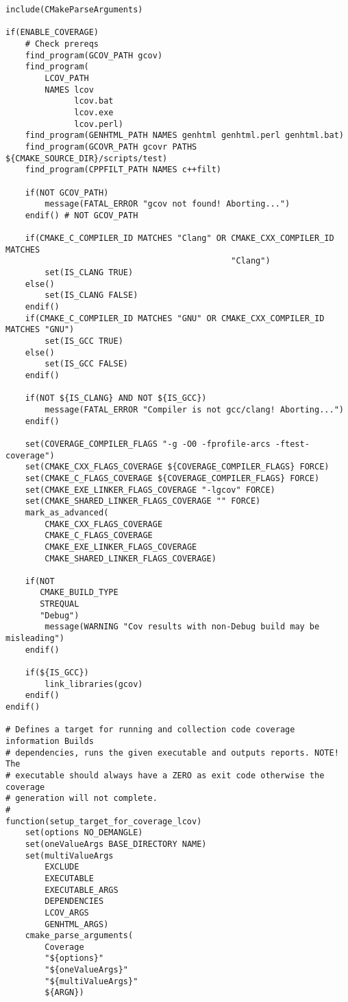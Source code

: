 \documentclass[openany]{report}
\begin{document}
\begin{verbatim}
include(CMakeParseArguments)

if(ENABLE_COVERAGE)
    # Check prereqs
    find_program(GCOV_PATH gcov)
    find_program(
        LCOV_PATH
        NAMES lcov
              lcov.bat
              lcov.exe
              lcov.perl)
    find_program(GENHTML_PATH NAMES genhtml genhtml.perl genhtml.bat)
    find_program(GCOVR_PATH gcovr PATHS ${CMAKE_SOURCE_DIR}/scripts/test)
    find_program(CPPFILT_PATH NAMES c++filt)

    if(NOT GCOV_PATH)
        message(FATAL_ERROR "gcov not found! Aborting...")
    endif() # NOT GCOV_PATH

    if(CMAKE_C_COMPILER_ID MATCHES "Clang" OR CMAKE_CXX_COMPILER_ID MATCHES
                                              "Clang")
        set(IS_CLANG TRUE)
    else()
        set(IS_CLANG FALSE)
    endif()
    if(CMAKE_C_COMPILER_ID MATCHES "GNU" OR CMAKE_CXX_COMPILER_ID MATCHES "GNU")
        set(IS_GCC TRUE)
    else()
        set(IS_GCC FALSE)
    endif()

    if(NOT ${IS_CLANG} AND NOT ${IS_GCC})
        message(FATAL_ERROR "Compiler is not gcc/clang! Aborting...")
    endif()

    set(COVERAGE_COMPILER_FLAGS "-g -O0 -fprofile-arcs -ftest-coverage")
    set(CMAKE_CXX_FLAGS_COVERAGE ${COVERAGE_COMPILER_FLAGS} FORCE)
    set(CMAKE_C_FLAGS_COVERAGE ${COVERAGE_COMPILER_FLAGS} FORCE)
    set(CMAKE_EXE_LINKER_FLAGS_COVERAGE "-lgcov" FORCE)
    set(CMAKE_SHARED_LINKER_FLAGS_COVERAGE "" FORCE)
    mark_as_advanced(
        CMAKE_CXX_FLAGS_COVERAGE
        CMAKE_C_FLAGS_COVERAGE
        CMAKE_EXE_LINKER_FLAGS_COVERAGE
        CMAKE_SHARED_LINKER_FLAGS_COVERAGE)

    if(NOT
       CMAKE_BUILD_TYPE
       STREQUAL
       "Debug")
        message(WARNING "Cov results with non-Debug build may be misleading")
    endif()

    if(${IS_GCC})
        link_libraries(gcov)
    endif()
endif()

# Defines a target for running and collection code coverage information Builds
# dependencies, runs the given executable and outputs reports. NOTE! The
# executable should always have a ZERO as exit code otherwise the coverage
# generation will not complete.
#
function(setup_target_for_coverage_lcov)
    set(options NO_DEMANGLE)
    set(oneValueArgs BASE_DIRECTORY NAME)
    set(multiValueArgs
        EXCLUDE
        EXECUTABLE
        EXECUTABLE_ARGS
        DEPENDENCIES
        LCOV_ARGS
        GENHTML_ARGS)
    cmake_parse_arguments(
        Coverage
        "${options}"
        "${oneValueArgs}"
        "${multiValueArgs}"
        ${ARGN})


\end{verbatim}
\end{document}
